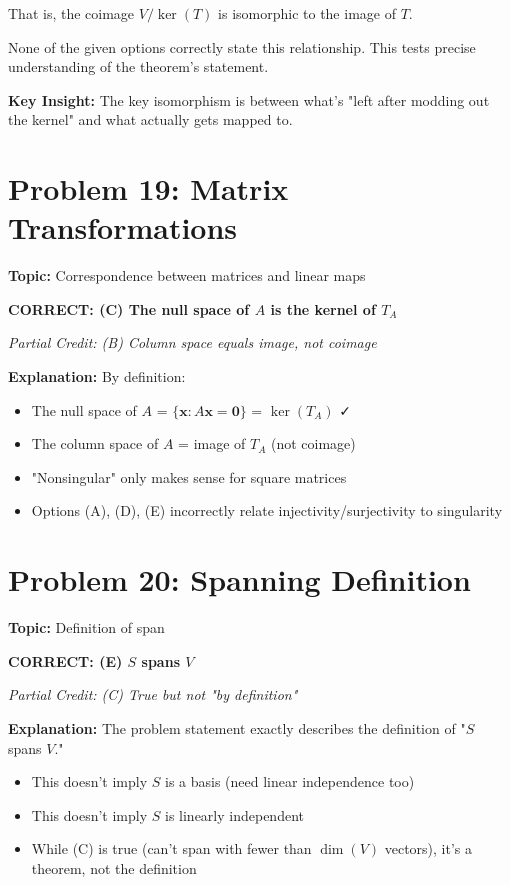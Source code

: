 \documentclass[12pt]{amsart}
\newcommand{\correct}[1]{{\color{blue}\textbf{CORRECT: #1}}}
\newcommand{\partcred}[1]{{\color{red}\textit{Partial Credit: #1}}}
\newcommand{\hint}{\textbf{Key Insight: }}
\begin{document}
That is, the coimage $V/\ker(T)$ is isomorphic to the image of $T$.

None of the given options correctly state this relationship. This tests precise understanding of the theorem's statement.

\hint The key isomorphism is between what's "left after modding out the kernel" and what actually gets mapped to.

\hrulefill

\section*{Problem 19: Matrix Transformations}
\textbf{Topic:} Correspondence between matrices and linear maps

\correct{(C) The null space of $A$ is the kernel of $T_A$}

\partcred{(B) Column space equals image, not coimage}

\textbf{Explanation:} By definition:
\begin{itemize}
\item The null space of $A$ = $\{\mathbf{x} : A\mathbf{x} = \mathbf{0}\}$ = $\ker(T_A)$ ✓
\item The column space of $A$ = image of $T_A$ (not coimage)
\item "Nonsingular" only makes sense for square matrices
\item Options (A), (D), (E) incorrectly relate injectivity/surjectivity to singularity
\end{itemize}

\hrulefill

\section*{Problem 20: Spanning Definition}
\textbf{Topic:} Definition of span

\correct{(E) $S$ spans $V$}

\partcred{(C) True but not "by definition"}

\textbf{Explanation:} The problem statement exactly describes the definition of "$S$ spans $V$."

\begin{itemize}
\item This doesn't imply $S$ is a basis (need linear independence too)
\item This doesn't imply $S$ is linearly independent
\item While (C) is true (can't span with fewer than $\dim(V)$ vectors), it's a theorem, not the definition
\end{itemize}
\end{document}
